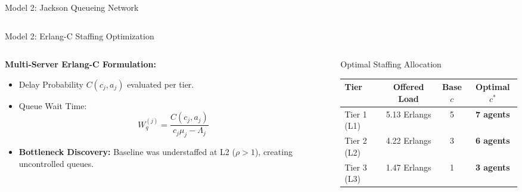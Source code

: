 \documentclass[10pt,aspectratio=169]{beamer}
\begin{document}
\begin{frame}{Model 2: Jackson Queueing Network}
\begin{columns}[c]
\begin{column}{0.46\textwidth}
        \end{column}
    \end{columns}
\end{frame}

\begin{frame}{Model 2: Erlang-C Staffing Optimization}
    \begin{columns}[c]
        \begin{column}{0.48\textwidth}
            \textbf{Multi-Server Erlang-C Formulation:}
            \vspace{0.2cm}
            \begin{itemize}
                \setlength\itemsep{0.5em}
                \item Delay Probability $C(c_j, a_j)$ evaluated per tier.
                \item Queue Wait Time:
                \[ W_q^{(j)} = \frac{C(c_j, a_j)}{c_j \mu_j - \Lambda_j} \]
                \item \textbf{Bottleneck Discovery:} Baseline was understaffed at L2 ($\rho > 1$), creating uncontrolled queues.
            \end{itemize}
        \end{column}
        \begin{column}{0.48\textwidth}
            \begin{block}{Optimal Staffing Allocation}
                \centering
                \vspace{0.15cm}
                \small
                \begin{tabular}{lccc}
                    \toprule
                    \textbf{Tier} & \textbf{Offered Load} & \textbf{Base $c$} & \textbf{Optimal $c^*$} \\
                    \midrule
                    Tier 1 (L1) & 5.13 Erlangs & 5 & \textbf{7 agents} \\
                    Tier 2 (L2) & 4.22 Erlangs & 3 & \textbf{6 agents} \\
                    Tier 3 (L3) & 1.47 Erlangs & 1 & \textbf{3 agents} \\

\end{tabular}
\end{block}
\end{column}
\end{columns}
\end{frame}
\end{document}
